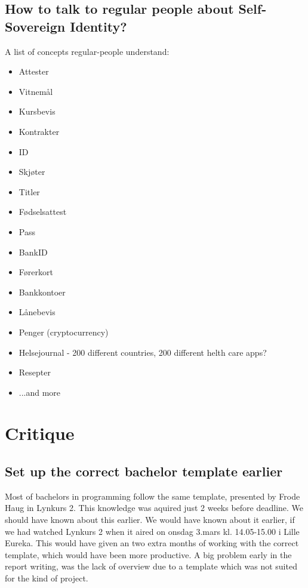 \newpage

\subsection{How to talk to regular people about Self-Sovereign Identity?}

A list of concepts regular-people understand:
\begin{itemize}
    \item Attester
    \item Vitnemål
    \item Kursbevis
    \item Kontrakter
    \item ID
    \item Skjøter
    \item Titler
    \item Fødselsattest
    \item Pass
    \item BankID
    \item Førerkort
    \item Bankkontoer
    \item Lånebevis
    \item Penger (cryptocurrency)
    \item Helsejournal - 200 different countries, 200 different helth care apps?
    \item Resepter
    \item ...and more
\end{itemize}









\section{Critique}

\subsection{Set up the correct bachelor template earlier}

Most of bachelors in programming follow the same template, presented by Frode Haug in Lynkurs 2. This knowledge was aquired just 2 weeks before deadline. We should have known about this earlier. We would have known about it earlier, if we had watched Lynkurs 2 when it aired on onsdag 3.mars kl. 14.05-15.00 i Lille Eureka. This would have given an two extra months of working with the correct template, which would have been more productive. A big problem early in the report writing, was the lack of overview due to a template which was not suited for the kind of project.



